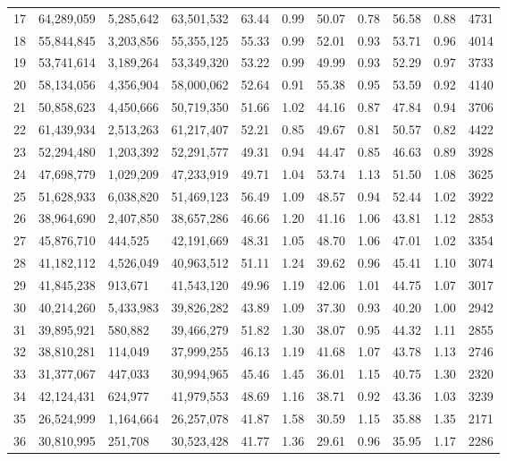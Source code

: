 \begin{table}[p]
\begin{tabular}{|c|p{1.3cm}|p{1.3cm}|p{1.2cm}|p{0.8cm}|p{0.8cm}|p{0.8cm}|p{0.8cm}|p{0.8cm}|p{0.8cm}|p{0.8cm}|}
17 & 64,289,059 & 5,285,642 & 63,501,532 & 63.44 & 0.99 & 50.07 & 0.78 & 56.58 & 0.88 & 4731 \\
18 & 55,844,845 & 3,203,856 & 55,355,125 & 55.33 & 0.99 & 52.01 & 0.93 & 53.71 & 0.96 & 4014 \\
19 & 53,741,614 & 3,189,264 & 53,349,320 & 53.22 & 0.99 & 49.99 & 0.93 & 52.29 & 0.97 & 3733 \\
20 & 58,134,056 & 4,356,904 & 58,000,062 & 52.64 & 0.91 & 55.38 & 0.95 & 53.59 & 0.92 & 4140 \\
21 & 50,858,623 & 4,450,666 & 50,719,350 & 51.66 & 1.02 & 44.16 & 0.87 & 47.84 & 0.94 & 3706 \\
22 & 61,439,934 & 2,513,263 & 61,217,407 & 52.21 & 0.85 & 49.67 & 0.81 & 50.57 & 0.82 & 4422 \\
23 & 52,294,480 & 1,203,392 & 52,291,577 & 49.31 & 0.94 & 44.47 & 0.85 & 46.63 & 0.89 & 3928 \\
24 & 47,698,779 & 1,029,209 & 47,233,919 & 49.71 & 1.04 & 53.74 & 1.13 & 51.50 & 1.08 & 3625 \\
25 & 51,628,933 & 6,038,820 & 51,469,123 & 56.49 & 1.09 & 48.57 & 0.94 & 52.44 & 1.02 & 3922 \\
26 & 38,964,690 & 2,407,850 & 38,657,286 & 46.66 & 1.20 & 41.16 & 1.06 & 43.81 & 1.12 & 2853 \\
27 & 45,876,710 & 444,525 & 42,191,669 & 48.31 & 1.05 & 48.70 & 1.06 & 47.01 & 1.02 & 3354 \\
28 & 41,182,112 & 4,526,049 & 40,963,512 & 51.11 & 1.24 & 39.62 & 0.96 & 45.41 & 1.10 & 3074 \\
29 & 41,845,238 & 913,671 & 41,543,120 & 49.96 & 1.19 & 42.06 & 1.01 & 44.75 & 1.07 & 3017 \\
30 & 40,214,260 & 5,433,983 & 39,826,282 & 43.89 & 1.09 & 37.30 & 0.93 & 40.20 & 1.00 & 2942 \\
31 & 39,895,921 & 580,882 & 39,466,279 & 51.82 & 1.30 & 38.07 & 0.95 & 44.32 & 1.11 & 2855 \\
32 & 38,810,281 & 114,049 & 37,999,255 & 46.13 & 1.19 & 41.68 & 1.07 & 43.78 & 1.13 & 2746 \\
33 & 31,377,067 & 447,033 & 30,994,965 & 45.46 & 1.45 & 36.01 & 1.15 & 40.75 & 1.30 & 2320 \\
34 & 42,124,431 & 624,977 & 41,979,553 & 48.69 & 1.16 & 38.71 & 0.92 & 43.36 & 1.03 & 3239 \\
35 & 26,524,999 & 1,164,664 & 26,257,078 & 41.87 & 1.58 & 30.59 & 1.15 & 35.88 & 1.35 & 2171 \\
36 & 30,810,995 & 251,708 & 30,523,428 & 41.77 & 1.36 & 29.61 & 0.96 & 35.95 & 1.17 & 2286 \\

\end{tabular}
\end{table}
